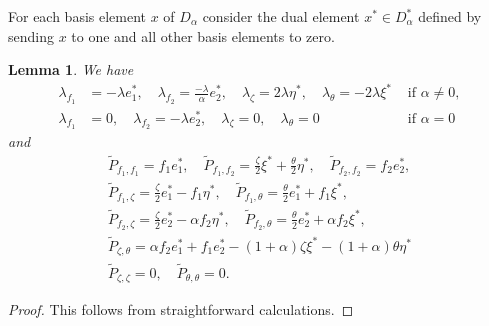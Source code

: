 \documentclass{amsart}
\newtheorem{lemma}[theorem]{Lemma}
\numberwithin{theorem}{section}
\theoremstyle{definition}
\theoremstyle{remark}
\begin{document}
For each basis element $x$ of $D_\alpha$ consider the dual element $x^\ast \in D_\alpha^\ast$ defined by sending $x$ to one and all other basis elements to zero.
\begin{lemma}\label{Lem Bessel}
We have
\begin{align*}
\lambda_{f_1} &= -\lambda e_1^\ast, \quad \lambda_{f_2} = \frac{-\lambda}{\alpha} e_2^\ast, \quad \lambda_{\zeta}=2 \lambda \eta^\ast, \quad \lambda_\theta = -2 \lambda \xi^\ast &\text{ if }\alpha\neq 0,\\
\lambda_{f_1} &= 0, \quad \lambda_{f_2} = -\lambda e_2^\ast, \quad \lambda_{\zeta}=0, \quad \lambda_\theta = 0 &\text{ if }\alpha = 0
\end{align*}
and 
\begin{gather*}
\widetilde{P}_{f_1,f_1 } = f_1 e_1^\ast, \quad  \widetilde{P}_{f_1,f_2 } = \frac{\zeta}{2} \xi^\ast+ \frac{\theta}{2} \eta^\ast, \quad \widetilde{P}_{f_2,f_2 } = f_2 e_2^\ast,  \\
\widetilde{P}_{f_1,\zeta } = \frac{\zeta}{2} e_1^\ast- f_1 \eta^\ast, \quad
\widetilde{P}_{f_1,\theta } = \frac{\theta}{2} e_1^\ast+ f_1 \xi^\ast, \\
\widetilde{P}_{f_2,\zeta } = \frac{\zeta}{2} e_2^\ast- \alpha f_2 \eta^\ast, \quad
\widetilde{P}_{f_2,\theta } = \frac{\theta}{2} e_2^\ast+ \alpha f_2 \xi^\ast, \\
\widetilde{P}_{\zeta,\theta } = \alpha f_2 e_1^\ast + f_1 e_2^\ast-(1+\alpha) \zeta \xi^\ast -(1+\alpha) \theta \eta^\ast \\
\widetilde{P}_{\zeta,\zeta } =0, \quad \widetilde{P}_{\theta,\theta }=0.
\end{gather*}
\end{lemma}

\begin{proof}
This follows from straightforward calculations.
\end{proof}
\end{document}
